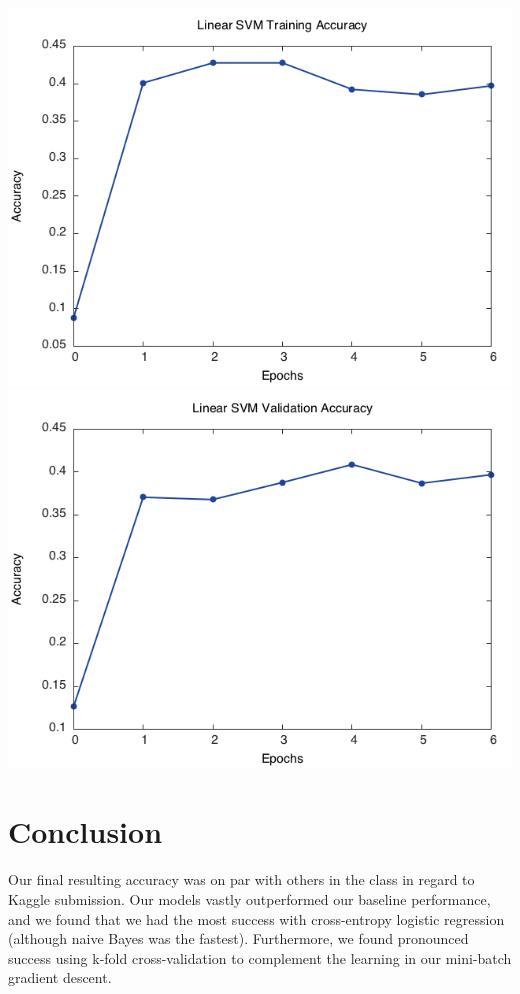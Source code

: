 \documentclass[11pt]{article}
\begin{document}
\includegraphics[scale=0.33]{svm_train_sst1}
\includegraphics[scale=0.33]{svm_valid_sst1}

\section{Conclusion}

Our final resulting accuracy was on par with others in the class in regard to Kaggle submission. Our models vastly outperformed our baseline performance, and we found that we had the most success with cross-entropy logistic regression (although naive Bayes was the fastest). Furthermore, we found pronounced success using k-fold cross-validation to complement the learning in our mini-batch gradient descent.
\end{document}

